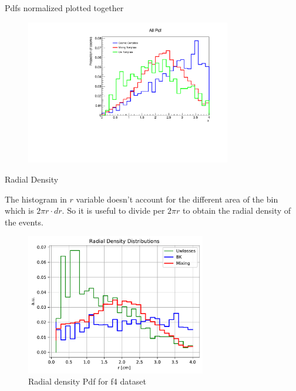 \documentclass[9pt]{beamer}
\begin{document}
\begin{frame}{Pdfs normalized plotted together}
\begin{figure}
\includegraphics[width = 0.80\textwidth ,left]{PdfTogether.pdf}
\end{figure}
\end{frame}

\begin{frame}{Radial Density}

The histogram in $r$ variable doesn't account for the different area of the bin which is $2 \pi r \cdot dr$. So it is useful to divide per $2 \pi r$ to obtain the radial density of the events.

\begin{figure}[hbtp]
\centering
\includegraphics[width = 0.7\textwidth , left]{RadialDensity.pdf}
\caption{Radial density Pdf for f4 dataset}
\end{figure}
\end{frame}
\end{document}
